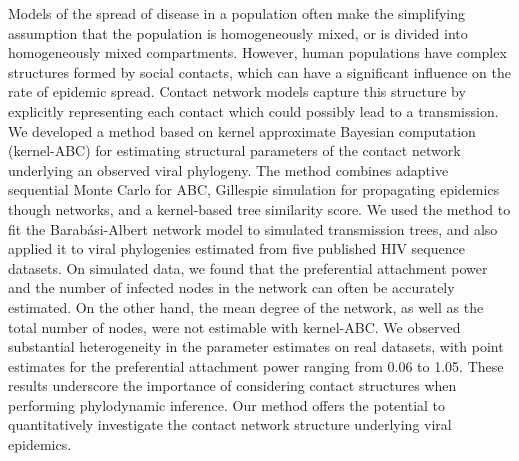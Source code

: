 Models of the spread of disease in a population often make the simplifying
assumption that the population is homogeneously mixed, or is divided into
homogeneously mixed compartments. However, human populations have complex
structures formed by social contacts, which can have a significant influence on
the rate of epidemic spread. Contact network models capture this structure by
explicitly representing each contact which could possibly lead to a
transmission. We developed a method based on kernel approximate Bayesian
computation (kernel-ABC) for estimating structural parameters of the contact
network underlying an observed viral phylogeny. The method combines adaptive
sequential Monte Carlo for ABC, Gillespie simulation for propagating epidemics
though networks, and a kernel-based tree similarity score. We used the method
to fit the Barab\'{a}si-Albert network model to simulated transmission trees,
and also applied it to viral phylogenies estimated from five published HIV
sequence datasets. On simulated data, we found that the preferential attachment
power and the number of infected nodes in the network can often be accurately
estimated. On the other hand, the mean degree of the network, as well as the
total number of nodes, were not estimable with kernel-ABC. We observed
substantial heterogeneity in the parameter estimates on real datasets, with
point estimates for the preferential attachment power ranging from 0.06 to 1.05.
These results underscore the importance of considering contact structures when
performing phylodynamic inference. Our method offers the potential to
quantitatively investigate the contact network structure underlying viral
epidemics.

